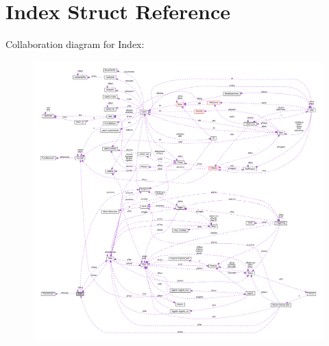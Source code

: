 \hypertarget{struct_index}{\section{Index Struct Reference}
\label{struct_index}
}


Collaboration diagram for Index\-:\nopagebreak
\begin{figure}[H]
\begin{center}
\leavevmode
\includegraphics[width=350pt]{struct_index__coll__graph}
\end{center}
\end{figure}
